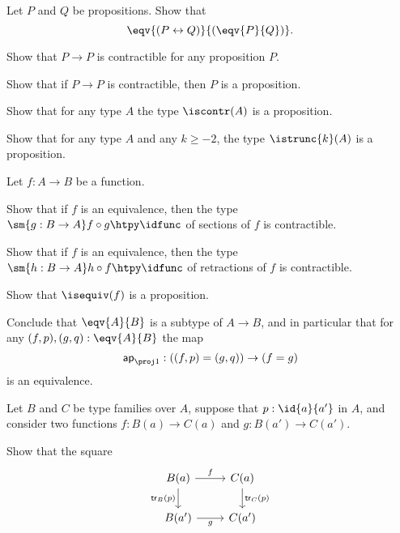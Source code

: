 \begin{exercises}
\item 
\begin{subexenum}
\item Let $P$ and $Q$ be propositions. Show that
\begin{equation*}
\eqv{(P\leftrightarrow Q)}{(\eqv{P}{Q})}.
\end{equation*}
\item Show that $P\to P$ is contractible for any proposition $P$.
\item Show that if $P\to P$ is contractible, then $P$ is a proposition.
\end{subexenum}
\item 
\begin{subexenum}
\item Show that for any type $A$ the type $\iscontr(A)$ is a proposition.
\item Show that for any type $A$ and any $k\geq-2$, the type $\istrunc{k}(A)$ is a proposition.
\end{subexenum}
\item Let $f:A\to B$ be a function.
\begin{subexenum}
\item Show that if $f$ is an equivalence, then the type $\sm{g:B\to A}f\circ g\htpy \idfunc$ of sections of $f$ is contractible.
\item Show that if $f$ is an equivalence, then the type $\sm{h:B\to A}h\circ f\htpy \idfunc$ of retractions of $f$ is contractible.
\item Show that $\isequiv(f)$ is a proposition.
\end{subexenum}
Conclude that $\eqv{A}{B}$ is a subtype of $A\to B$, and in particular that for any $(f,p),(g,q):\eqv{A}{B}$ the map
\begin{equation*}
\mathsf{ap}_{\proj 1} : ((f,p)= (g,q))\to (f=g)
\end{equation*}
is an equivalence.
\item Let $B$ and $C$ be type families over $A$, suppose that $p:\id{a}{a'}$ in $A$, and consider two functions $f:B(a)\to C(a)$ and $g:B(a')\to C(a')$.
\begin{subexenum}
\item Show that the square
\begin{equation*}
\begin{tikzcd}
B(a) \arrow[r,"f"] \arrow[d,swap,"\mathsf{tr}_B(p)"] & C(a) \arrow[d,"\mathsf{tr}_C(p)"] \\
B(a') \arrow[r,swap,"g"] & C(a')

\end{tikzcd}
\end{equation*}
\end{subexenum}
\end{exercises}
